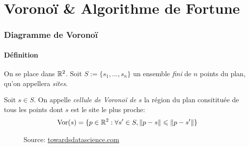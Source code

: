 \section{Voronoï \& Algorithme de Fortune}

\begin{frame}
    \tableofcontents[currentsection]
\end{frame}

\begin{frame}
\frametitle{Diagramme de Voronoï}
\framesubtitle{Définition}

On se place dans \(\mathbb{R}^2\). Soit \(S := \{s_1, ..., s_n\}\) un ensemble \emph{fini} de \(n\) points du plan, qu'on appellera \emph{sites}.

\begin{defini}
    Soit \(s \in S\). On appelle \emph{cellule de Voronoï de \(s\)} la région du plan consitituée de tous les points dont \(s\) est le site le plus proche:
    \[\operatorname{\mathrm{Vor}}(s) = \{p \in \mathbb{R}^2: \forall s' \in S, \|p-s\| \leqslant \|p-s'\|\}\]
\end{defini}

\begin{figure}
    \centering
    \def\stackalignment{r}
       {\sources
        Source: \url{towardsdatascience.com}}
\end{figure}


\end{frame}

